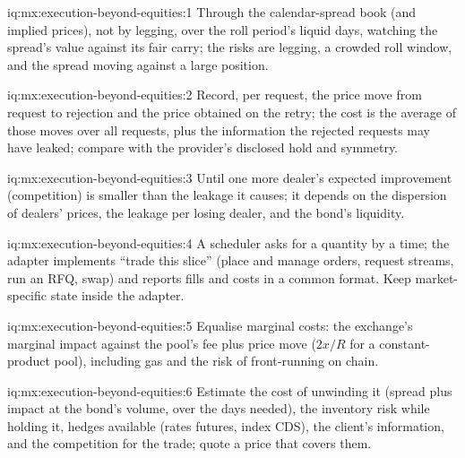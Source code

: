 \begin{solution}{iq:mx:execution-beyond-equities:1}
Through the calendar-spread book (and implied prices), not by legging, over the roll period's liquid days, watching the spread's value against its
fair carry; the risks are legging, a crowded roll window, and the spread moving against a large position.
\end{solution}

\begin{solution}{iq:mx:execution-beyond-equities:2}
Record, per request, the price move from request to rejection and the price obtained on the retry; the cost is the average of those moves over all
requests, plus the information the rejected requests may have leaked; compare with the provider's disclosed hold and symmetry.
\end{solution}

\begin{solution}{iq:mx:execution-beyond-equities:3}
Until one more dealer's expected improvement (competition) is smaller than the leakage it causes; it depends on the dispersion of dealers' prices,
the leakage per losing dealer, and the bond's liquidity.
\end{solution}

\begin{solution}{iq:mx:execution-beyond-equities:4}
A scheduler asks for a quantity by a time; the adapter implements ``trade this slice'' (place and manage orders, request streams, run an RFQ, swap) and
reports fills and costs in a common format. Keep market-specific state inside the adapter.
\end{solution}

\begin{solution}{iq:mx:execution-beyond-equities:5}
Equalise marginal costs: the exchange's marginal impact against the pool's fee plus price move ($2x/R$ for a constant-product pool), including gas and
the risk of front-running on chain.
\end{solution}

\begin{solution}{iq:mx:execution-beyond-equities:6}
Estimate the cost of unwinding it (spread plus impact at the bond's volume, over the days needed), the inventory risk while holding it, hedges
available (rates futures, index CDS), the client's information, and the competition for the trade; quote a price that covers them.
\end{solution}
